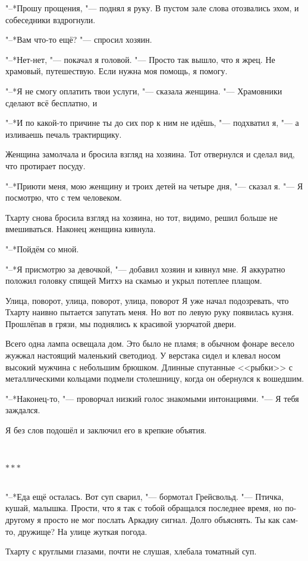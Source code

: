 \documentclass[a4paper,10pt]{book}
\newcommand{\ldotst}{\so{...}\xspace}
\newcommand{\razd}{~\\{\centering\Large\bfseries$\ast \ast \ast$\par}~\\}
\begin{document}
"--*Прошу прощения, "--- поднял я руку. В пустом зале слова отозвались эхом, и 
собеседники вздрогнули.

"--*Вам что-то ещё? "--- спросил хозяин.

"--*Нет-нет, "--- покачал я головой. "--- Просто так вышло, что я жрец. Не 
храмовый, путешествую. Если нужна моя помощь, я помогу.

"--*Я не смогу оплатить твои услуги, "--- сказала женщина. "--- Храмовники 
сделают всё бесплатно, и\ldotst

"--*И по какой-то причине ты до сих пор к ним не идёшь, "--- подхватил я, "--- 
а 
изливаешь печаль трактирщику.

Женщина замолчала и бросила взгляд на хозяина. Тот отвернулся и сделал вид, что 
протирает посуду.

"--*Приюти меня, мою женщину и троих детей на четыре дня, "--- сказал я. "--- Я 
посмотрю, что с тем человеком.

Тхарту снова бросила взгляд на хозяина, но тот, видимо, решил больше не 
вмешиваться. Наконец женщина кивнула.

"--*Пойдём со мной.

"--*Я присмотрю за девочкой, "--- добавил хозяин и кивнул мне. Я аккуратно 
положил головку спящей Митхэ на скамью и укрыл потеплее плащом.

Улица, поворот, улица, поворот, улица, поворот\ldotst Я уже начал подозревать, 
что Тхарту наивно пытается запутать меня. Но вот по левую руку появилась кузня. 
Прошлёпав в грязи, мы поднялись к красивой узорчатой двери.

Всего одна лампа освещала дом. Это было не пламя; в обычном фонаре весело 
жужжал 
настоящий маленький светодиод. У верстака сидел и клевал носом высокий мужчина 
с 
небольшим 
брюшком. Длинные спутанные <<рыбки>> с металлическими 
кольцами подмели столешницу, когда он обернулся к вошедшим.

"--*Наконец-то, "--- проворчал низкий голос знакомыми интонациями. "--- Я тебя 
заждался.

Я без слов подошёл и заключил его в крепкие объятия.

\razd

"--*Еда ещё осталась. Вот суп сварил, "--- бормотал Грейсвольд. "--- Птичка, 
кушай, малышка. Прости, что я так с тобой обращался последнее время, но 
по-другому 
я просто не мог послать Аркадиу сигнал. Долго объяснять.
Ты как сам-то, дружище? На улице жуткая погода.

Тхарту с круглыми глазами, почти не слушая, хлебала томатный суп.
\end{document}
